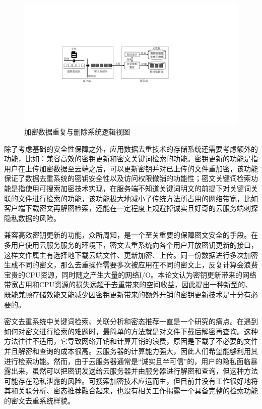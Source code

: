 \documentclass[promaster]{thesis-uestc}
\begin{document}
\begin{figure}[htbp]
    \centering
    \includegraphics[width = 1.0\linewidth]{pic/加密数据重复与删除系统逻辑图}
    \caption{加密数据重复与删除系统逻辑视图}
    \label{加密数据重复与删除系统逻辑视图}
\end{figure}

除了考虑基础的安全性保障之外，应用数据去重技术的存储系统还需要考虑额外的功能，比如：兼容高效的密钥更新和密文关键词检索的功能。密钥更新的功能是指用户在上传加密数据至云端之后，可以更新密钥并对已上传的文件重加密，该功能保证了数据去重系统的密钥安全性以及访问权限撤销的功能性；密文关键词检索功能是指使用可搜索加密技术实现，在服务端不知道关键词明文的前提下对关键词关联的文件进行检索的功能，该功能极大地减小了传统方法所占用的网络带宽，比如客户端下载密文再解密检索，还能在一定程度上规避掉诚实且好奇的云服务端刺探隐私数据的风险。

兼容高效密钥更新的功能，众所周知，是一个至关重要的保障密文安全的手段。在多用户使用云服务服务的环境下，密文去重系统向各个用户开放密钥更新的接口，这样文件属主有选择地下载云端文件、更新加密、上传。同一份数据进行多次加密生成不同的密文，那么去重操作需要多次被应用在不同的密文上，反复计算会浪费宝贵的CPU资源，同时随之产生大量的网络I/O。本论文认为密钥更新带来的网络带宽占用和CPU资源的损失远超于去重带来的空间收益，因此提出一种新型的、既能兼顾存储效能又能减少因密钥更新带来的额外开销的密钥更新技术是十分有必要的。

密文去重系统中关键词检索、关联分析和密态推荐一直是一个研究的痛点。在遇到如何对密文进行检索的难题时，最简单的方法就是对文件下载后解密再查询。这种方法往往不适用，它导致网络开销和计算开销的浪费，原因是下载了不必要的文件并且解密和查询的成本很高。云服务器的计算能力强大，因此人们希望能够利用其进行检索功能。然而，由于云服务器通常是“诚实且半可信”的，用户的隐私面临暴露出来，虽然可以把密钥发送给云服务器并由服务器进行解密和查询，但这种方法可能存在隐私泄露的风险。可搜索加密技术应运而生，但目前并没有工作很好地将其和关联分析、密态推荐融合起来，也没有相关工作揭露一个具备完整的检索功能的密文去重系统样貌。
\end{document}
